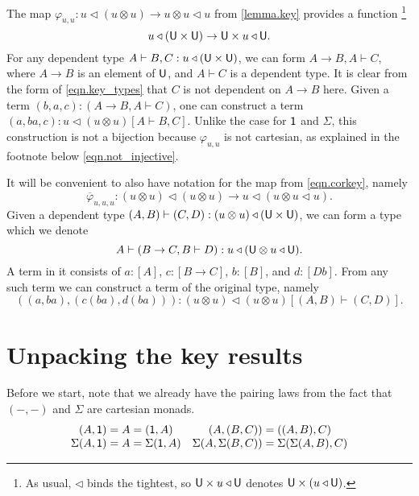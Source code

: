 \documentclass[11pt, one side, article]{memoir}
\theoremstyle{definition}
\theoremstyle{plain}
\newcommand{\tn}[1]{\textnormal{#1}}
\newcommand{\ol}[1]{\overline{#1}}
\newcommand{\0}{\textsf{0}}
\newcommand{\1}{\tn{\textsf{1}}}
\newcommand{\U}{\tn{\textsf{U}}}
\newcommand{\tri}{\mathbin{\triangleleft}}
\begin{document}
The map $\varphi_{u,u}\colon u\tri (u\otimes u)\to u\otimes u\tri u$ from \cref{lemma.key} provides a function%
\footnote{As usual, $\tri$ binds the tightest, so $\U\times u\tri \U$ denotes $\U\times(u\tri \U)$.}
\begin{equation}\label{eqn.key_types}
	u\tri(\U\times\U)\to \U\times u\tri \U.
\end{equation}
For any dependent type $A\vdash B,C:u\tri(\U\times\U)$, we can form $A\to B,A\vdash C$, where $A\to B$ is an element of $\U$, and $A\vdash C$ is a dependent type. It is clear from the form of \eqref{eqn.key_types} that $C$ is not dependent on $A\to B$ here. Given a term $(b,a,c):(A\to B,A\vdash C)$, one can construct a term $(a,ba,c):u\tri(u\otimes u)[A\vdash B,C]$. Unlike the case for $\1$ and $\Sigma$, this construction is not a bijection because $\varphi_{u,u}$ is not cartesian, as explained in the footnote below \eqref{eqn.not_injective}.

It will be convenient to also have notation for the map from \eqref{eqn.corkey}, namely
\[\ol\varphi_{u,u,u}\colon (u\otimes u)\tri(u\otimes u)\to u\tri(u\otimes u\tri u).\]
Given a dependent type $(A,B)\vdash(C,D):(u\otimes u)\tri(\U\times \U)$, we can form a type which we denote 
\[A\vdash(B\to C,B\vdash D):u\tri(\U\otimes u\tri \U).\]
A term in it consists of $a:[A]$, $c:[B\to C]$, $b:[B]$, and $d:[Db]$. From any such term we can construct a term of the original type, namely
\[((a,ba),(c(ba), d(ba))):(u\otimes u)\tri(u\otimes u)[(A,B)\vdash(C,D)].\]

\section{Unpacking the key results}


Before we start, note that we already have the pairing laws from the fact that $(-,-)$ and $\Sigma$ are cartesian monads.
\[
\begin{array}{cc}
	(A,\1)=A=(\1,A)&(A,(B,C))=((A,B),C)\\
	\Sigma(A,\1)=A=\Sigma(\1,A)&
		\Sigma(A,\Sigma(B,C))=\Sigma(\Sigma(A,B),C)
\end{array}
\]
\end{document}
